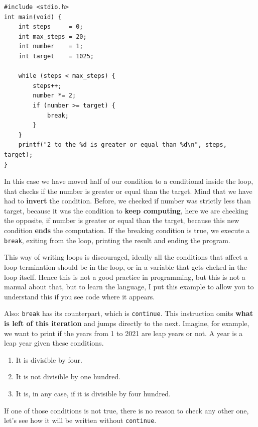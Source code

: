 \documentclass[a4paper]{article}
\begin{document}
\noindent
\begin{minipage}[H]{\linewidth}
\mbox{}
\begin{lstlisting}[style=C,
caption={Interrupción de un bucle con la instrucción \texttt{break}},
label={lst:breakExample}]
#include <stdio.h>
int main(void) {
    int steps     = 0;
    int max_steps = 20;
    int number    = 1;
    int target    = 1025;

    while (steps < max_steps) {
        steps++;
        number *= 2;
        if (number >= target) {
            break;
        }
    }
    printf("2 to the %d is greater or equal than %d\n", steps, target);
}
\end{lstlisting}
\end{minipage}

In this case we have moved half of our condition to a conditional inside the
loop, that checks if the number is greater or equal than the target.
Mind that we have had to \textbf{invert} the condition. Before, we checked if
number was strictly less than target, because it was the condition to
\textbf{keep computing}, here we are checking the opposite, if number is greater
or equal than the target, because this new condition \textbf{ends} the
computation.
If the breaking condition is true,
we execute a \texttt{break}, exiting from the loop, printing the result
and ending the program.

This way of writing loops is discouraged, ideally all
the conditions that affect a loop termination should be in the loop, or in a
variable that gets cheked in the loop itself. Hence this is not a good practice
in programming, but this is not a manual about that, but to learn the language,
I put this example to allow you to understand this if you see code where it
appears.

Also: \texttt{break} has its counterpart, which is \texttt{continue}. This
instruction omits \textbf{what is left of this iteration} and jumps directly to
the next. Imagine, for example, we want to print if the years from 1 to 2021 are
leap years or not. A year is a leap year given these conditions.
\begin{enumerate}
    \item It is divisible by four.
    \item It is not divisible by one hundred.
    \item It is, in any case, if it is divisible by four hundred.
\end{enumerate}

If one of those conditions is not true, there is no reason to check any other
one, let's see how it will be written without \texttt{continue}.
\end{document}

